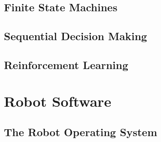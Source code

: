 \documentclass[nohyper,nobib]{tufte-book}
\begin{document}
\chapter{Finite State Machines}

\chapter{Sequential Decision Making}

\chapter{Reinforcement Learning}

% 

\part{Robot Software}
\chapter{The Robot Operating System}

% 

% 
% 
% 

\printbibliography
\end{document}
